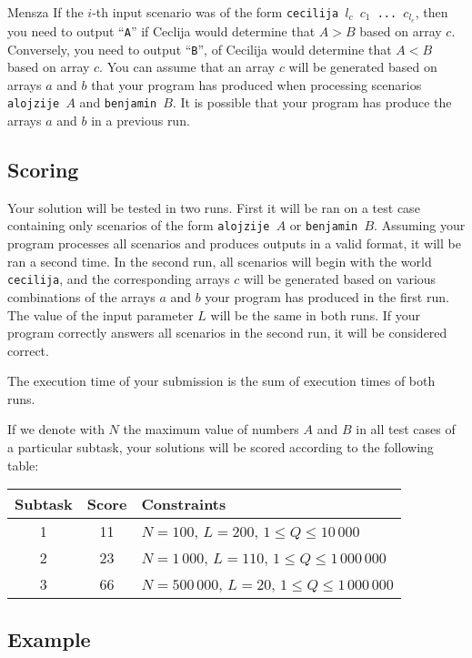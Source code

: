 \begin{statement}[
  problempoints=100,
  timelimit=5 seconds,
  memorylimit=512 MiB,
]{Mensza}
If the $i$-th input scenario was of the form \texttt{cecilija $l_c$ $c_1$ ...
$c_{l_c}$}, then you need to output ``\texttt{A}'' if Ceclija would determine
that $A > B$ based on array $c$. Conversely, you need to output ``\texttt{B}'',
of Cecilija would determine that $A < B$ based on array $c$. You can assume that
an array $c$ will be generated based on arrays $a$ and $b$ that your program has
produced when processing scenarios \texttt{alojzije $A$} and \texttt{benjamin $B$}.
It is possible that your program has produce the arrays $a$ and $b$ in a previous
run.

\subsection*{Scoring}
Your solution will be tested in two runs. First it will be ran on a test case
containing only scenarios of the form  \texttt{alojzije $A$} or
\texttt{benjamin $B$}. Assuming your program processes all scenarios and produces
outputs in a valid format, it will be ran a second time. In the second run, all
scenarios will begin with the world \texttt{cecilija}, and the corresponding
arrays $c$ will be generated based on various combinations of the arrays $a$
and $b$ your program has produced in the first run. The value of the input parameter
$L$ will be the same in both runs. If your program correctly answers all scenarios
in the second run, it will be considered correct.

The execution time of your submission is the sum of execution times of both runs.

If we denote with $N$ the maximum value of numbers $A$ and $B$ in all test cases
of a particular subtask, your solutions will be scored according to the following
table:

{\renewcommand{\arraystretch}{1.4}
  \setlength{\tabcolsep}{6pt}
  \begin{tabular}{ccl}
   Subtask & Score & Constraints \\ \midrule
    1 & 11 & $N = 100$, $L = 200$, $1 \le Q \le 10\,000$ \\
    2 & 23 & $N = 1\,000$, $L = 110$, $1 \le Q \le 1\,000\,000$ \\
    3 & 66 & $N = 500\,000$, $L = 20$, $1 \le Q \le 1\,000\,000$
\end{tabular}}

\subsection*{Example}

\end{statement}
